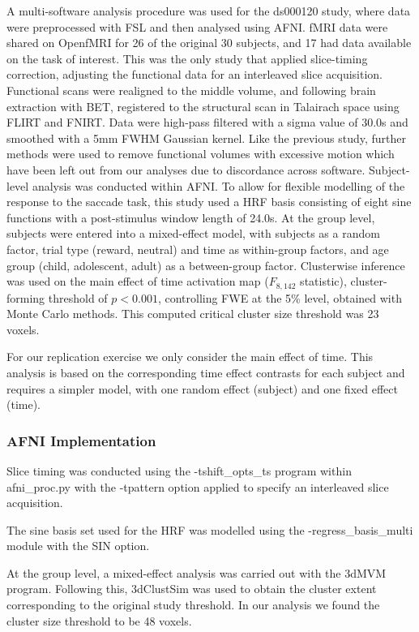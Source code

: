 A multi-software analysis procedure was used for the ds000120 study, where data were preprocessed with FSL and then analysed using AFNI. fMRI data were shared on OpenfMRI for 26 of the original 30 subjects, and 17 had data available on the task of interest. This was the only study that applied slice-timing correction, adjusting the functional data for an interleaved slice acquisition. Functional scans were realigned to the middle volume, and following brain extraction with BET, registered to the structural scan in Talairach space using FLIRT and FNIRT. Data were high-pass filtered with a sigma value of 30.0s and smoothed with a 5mm FWHM Gaussian kernel. Like the previous study, further methods were used to remove functional volumes with excessive motion which have been left out from our analyses due to discordance across software. Subject-level analysis was conducted within AFNI. To allow for flexible modelling of the response to the saccade task, this study used a HRF basis consisting of eight sine functions with a post-stimulus window length of 24.0s. At the group level, subjects were entered into a mixed-effect model, with subjects as a random factor, trial type (reward, neutral) and time as within-group factors, and age group (child, adolescent, adult) as a between-group factor. Clusterwise inference was used on the main effect of time activation map ($F_{8,142}$ statistic), cluster-forming threshold of $p < 0.001$, controlling FWE at the 5\% level, obtained with Monte Carlo methods. This computed critical cluster size threshold was 23 voxels. 

For our replication exercise we only consider the main effect of time.  This analysis is based on the corresponding time effect contrasts for each subject and requires a simpler model, with one random effect (subject) and one fixed effect (time). 


\subsubsection{AFNI Implementation}
Slice timing was conducted using the -tshift\_opts\_ts program within afni\_proc.py with the -tpattern option applied to specify an interleaved slice acquisition. 

The sine basis set used for the HRF was modelled using the -regress\_basis\_multi module with the SIN option.

At the group level, a mixed-effect analysis was carried out with the 3dMVM program. Following this, 3dClustSim was used to obtain the cluster extent corresponding to the original study threshold. In our analysis we found the cluster size threshold to be 48 voxels.

